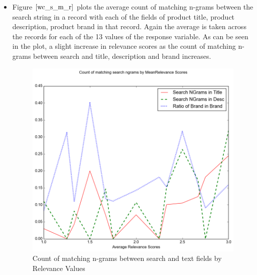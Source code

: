 \documentclass[twoside,12pt]{article}
\begin{document}
\begin{itemize}
		
\FloatBarrier
\item 
Figure $\eqref{wc_s_m_r}$ plots the average count of matching n-grams between the search string in a record with each of the fields of product title, product description, product brand in that record. Again the average is taken across the records for each of the 13 values of the response variable. As can be seen in the plot, a slight increase in relevance scores as the count of matching n-grams between search and title, description and brand increases.
\FloatBarrier
\begin{figure}[!htbp]
	\centering
	\includegraphics[scale=.43]{DataVisualization/ngrams_relv_plot.png} 
	\caption{Count of matching n-grams between search and text fields by Relevance Values}
	\label{wc_s_m_r}
\end{figure}


\end{itemize}
\end{document}
